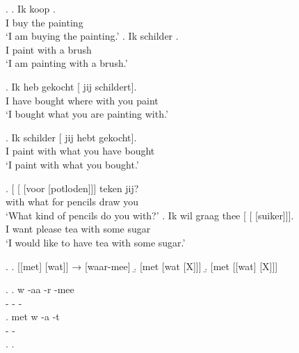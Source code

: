 \documentclass[xcolor=dvipsnames,10pt]{beamer}
\begin{document}
\begin{frame}

\ex.
\ag. Ik koop  .\\
 I buy the painting\\
 `I am buying the painting.'\label{ex:kopen}
\bg. Ik schilder   .\\
 I paint with a brush\\
 `I am painting with a brush.'\label{ex:schilderen}

 \pause

\exg. Ik heb gekocht [  jij schildert].\\
 I have bought where with you paint\\
 `I bought what you are painting with.'\label{ex:mismatchwaar-mee}

 \pause

\exg. Ik schilder  [ jij hebt gekocht].\\
 I paint with what you have bought\\
 `I paint with what you bought.'\label{ex:mismatchmetwat}

\end{frame}



\begin{frame}

\exg. [ [ [voor [potloden]]] teken jij?\\
 with what for pencils draw you\\
 `What kind of pencils do you with?'\label{ex:watwasfur}
\exg. Ik wil graag thee [ [ [suiker]]].\\
 I want please tea with some sugar\\
 `I would like to have tea with some sugar.'\label{ex:watindef}

\pause

\ex.\label{ex:summaryconst}
\a. [[met] [wat]] → [waar-mee]\label{ex:waar-meefr}
\b. [met [wat [X]]]\label{ex:metwatx}
\b. [met [[wat] [X]]]\label{ex:metwatfr}

\end{frame}


\begin{frame}

\ex.\label{ex:decompose}
\ag. w -aa -r -mee\\
 - - -\\
\bg. met w -a -t\\
  - -\\
\z.
\z.

\end{frame}
\end{document}
